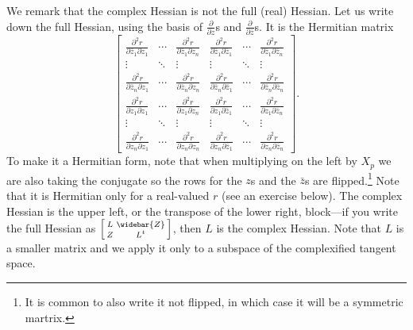 \documentclass[12pt,openany]{book}
\theoremstyle{plain}
\theoremstyle{remark}
\theoremstyle{definition}
\theoremstyle{exercise}
\theoremstyle{example}
\begin{document}
We remark that the complex Hessian is not the full (real) Hessian.
Let us write down the full Hessian, using the
basis of $\frac{\partial}{\partial z}$s and
$\frac{\partial}{\partial \bar{z}}$s.  It is
the Hermitian matrix
\begin{equation*}
\begin{bmatrix}
\frac{\partial^2 r}{\partial \bar{z}_1 \partial z_1}
& \cdots &
\frac{\partial^2 r}{\partial \bar{z}_1 \partial z_n}
&
\frac{\partial^2 r}{\partial \bar{z}_1 \partial \bar{z}_1}
& \cdots &
\frac{\partial^2 r}{\partial \bar{z}_1 \partial \bar{z}_n}
\\
\vdots & \ddots & \vdots & \vdots & \ddots & \vdots
\\
\frac{\partial^2 r}{\partial \bar{z}_n \partial z_1}
& \cdots &
\frac{\partial^2 r}{\partial \bar{z}_n \partial z_n}
&
\frac{\partial^2 r}{\partial \bar{z}_n \partial \bar{z}_1}
& \cdots &
\frac{\partial^2 r}{\partial \bar{z}_n \partial \bar{z}_n}
\\
\frac{\partial^2 r}{\partial z_1 \partial z_1}
& \cdots &
\frac{\partial^2 r}{\partial z_1 \partial z_n}
&
\frac{\partial^2 r}{\partial z_1 \partial \bar{z}_1}
& \cdots &
\frac{\partial^2 r}{\partial z_1 \partial \bar{z}_n}
\\
\vdots & \ddots & \vdots & \vdots & \ddots & \vdots
\\
\frac{\partial^2 r}{\partial z_n \partial z_1}
& \cdots &
\frac{\partial^2 r}{\partial z_n \partial z_n}
&
\frac{\partial^2 r}{\partial z_n \partial \bar{z}_1}
& \cdots &
\frac{\partial^2 r}{\partial z_n \partial \bar{z}_n}
\end{bmatrix}
.
\end{equation*}
To make it a Hermitian form, note that when multiplying on the left by $X_p$
we are also taking the conjugate so the rows for the $z$s and the $\bar{z}$s
are flipped.\footnote{It is common to also write it not flipped, in which case it
will be a symmetric martrix.}
Note that it is Hermitian only for a real-valued $r$ (see an exercise below).
The complex Hessian is the upper left,
or the transpose of the lower right, block---if you write the full Hessian as
$\Bigl[ \begin{smallmatrix} L & \widebar{Z} \\ Z & L^t \end{smallmatrix}
\Bigr]$, then $L$ is the complex Hessian.
Note that $L$ is a smaller matrix and we apply it only to a subspace
of the complexified tangent space.
\end{document}
